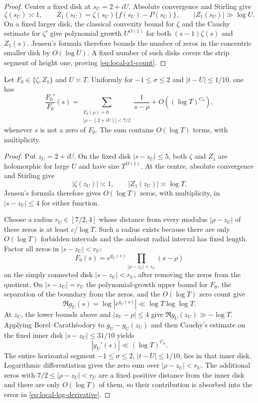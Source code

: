 \begin{proof}
Center a fixed disk at $s_U=2+iU$. Absolute convergence and Stirling give
\[
\zeta(s_U)\asymp1,
\qquad
Z_1(s_U)=\zeta(s_U)\{f(s_U)-P(s_U)\},
\qquad
|Z_1(s_U)|\gg\log U.
\]
On a fixed larger disk, the classical convexity bound for $\zeta$ and the
Cauchy estimate for $\zeta'$ give polynomial growth $U^{O(1)}$ for both
$(s-1)\zeta(s)$ and $Z_1(s)$. Jensen's formula therefore bounds the number of
zeros in the concentric smaller disk by $O(\log U)$. A fixed number of such
disks covers the strip segment of height one, proving
\eqref{eq:local-z1-count}.
\end{proof}

\begin{lemma}
\label{lem:local-log-derivative}
Let $F_0\in\{\zeta,Z_1\}$ and $U\asymp T$. Uniformly for
$-1\le\sigma\le2$ and $|t-U|\le1/10$, one has
\begin{equation}
\frac{F_0'}{F_0}(s)
=\sum_{\substack{F_0(\rho)=0\\|\rho-(2+iU)|<7/2}}
\frac1{s-\rho}+O((\log T)^{C_0}),
\label{eq:local-log-derivative}
\end{equation}
whenever $s$ is not a zero of $F_0$. The sum contains $O(\log T)$ terms,
with multiplicity.
\end{lemma}

\begin{proof}
Put $z_U=2+iU$. On the fixed disk $|s-z_U|\le5$, both $\zeta$ and $Z_1$
are holomorphic for large $U$ and have size $T^{O(1)}$. At the centre,
absolute convergence and Stirling give
\[
|\zeta(z_U)|\asymp1,
\qquad |Z_1(z_U)|\asymp\log T.
\]
Jensen's formula therefore gives $O(\log T)$ zeros, with multiplicity, in
$|s-z_U|\le4$ for either function.

Choose a radius $r_U\in[7/2,4]$ whose distance from every modulus
$|\rho-z_U|$ of these zeros is at least $c/\log T$. Such a radius exists
because there are only $O(\log T)$ forbidden intervals and the ambient radial
interval has fixed length. Factor all zeros in $|s-z_U|<r_U$:
\[
F_0(s)=e^{g_U(s)}
\prod_{|\rho-z_U|<r_U}(s-\rho)
\]
on the simply connected disk $|s-z_U|<r_U$, after removing the zeros from the
quotient. On $|s-z_U|=r_U$ the polynomial-growth upper bound for $F_0$, the
separation of the boundary from the zeros, and the $O(\log T)$ zero count give
\[
\Re g_U(s)=\log|e^{g_U(s)}|\ll \log T\log\log T.
\]
At $z_U$, the lower bounds above and
$|z_U-\rho|\le4$ give
$\Re g_U(z_U)\gg-\log T$. Applying Borel--Carath\'eodory to
$g_U-g_U(z_U)$ and then Cauchy's estimate on the fixed inner disk
$|s-z_U|\le 31/10$ yields
\[
|g_U'(s)|\ll(\log T)^{C_0}.
\]
The entire horizontal segment $-1\le\sigma\le2$, $|t-U|\le1/10$, lies in
that inner disk. Logarithmic differentiation gives the zero sum over
$|\rho-z_U|<r_U$. The additional zeros with
$7/2\le|\rho-z_U|<r_U$ are a fixed positive distance from the inner disk and
there are only $O(\log T)$ of them, so their contribution is absorbed into the
error in \eqref{eq:local-log-derivative}.
\end{proof}

